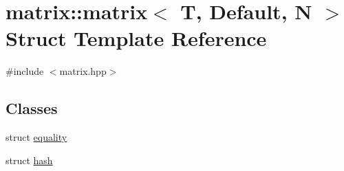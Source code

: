 \hypertarget{structmatrix_1_1matrix}{}\section{matrix\+:\+:matrix$<$ T, Default, N $>$ Struct Template Reference}
\label{structmatrix_1_1matrix}


{\ttfamily \#include $<$matrix.\+hpp$>$}

\subsection*{Classes}
\begin{DoxyCompactItemize}
\item 
struct \hyperlink{structmatrix_1_1matrix_1_1equality}{equality}
\item 
struct \hyperlink{structmatrix_1_1matrix_1_1hash}{hash}
\end{DoxyCompactItemize}
